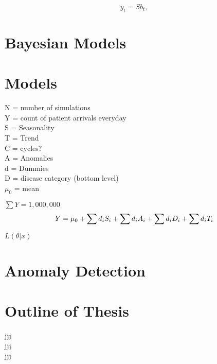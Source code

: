 \begin{equation}
{y}_t={S}{b}_{t},
\tag{add tag here}
\end{equation}
	
	
	\section{Bayesian Models}
	
		\section{Models}
	
	N = number of simulations\\
	Y = count of patient arrivals everyday\\
	S = Seasonality\\
	T = Trend\\
	C = cycles? \\
	A = Anomalies\\
	d = Dummies\\
	D = disease category (bottom level)\\
	$\mu_0$ = mean
	
	
	$\sum{Y} = 1,000,000$\\
	
	
	
	\begin{equation}
	Y = \mu_0 + \sum{d_iS_i}+ \sum{d_iA_i} + \sum{d_iD_i} + \sum{d_iT_i}\\
	\end{equation}
	
	$L(\theta|x)$
	\section{Anomaly Detection}


	\section{Outline of Thesis}
	
	jjj\\
	jjj\\
	jjj
	
